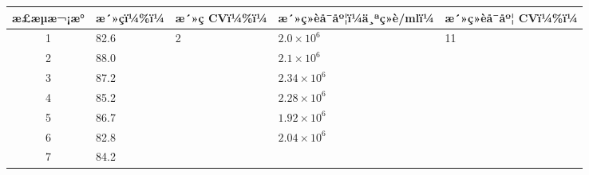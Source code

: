 \documentclass[UTF8,10pt,a4paper,fontset=fandol]{ctexart}
\newcommand{\fieldvalue}[1]{#1}
\newcommand{\handwritten}[1]{#1}
\begin{document}
\begin{center}
\begin{center}
\small
\begin{tabularx}{\textwidth}{|c|X|X|X|X|}
\hline
æ£æµæ¬¡æ° & æ´»çï¼\%ï¼ & æ´»ç CVï¼\%ï¼ & æ´»ç»èå¯åº¦ï¼ä¸ªç»è/mlï¼ & æ´»ç»èå¯åº¦ CVï¼\%ï¼ \\
\hline
1 &
\fieldvalue{\handwritten{82.6}} &
\multirow{9}{*}{
\fieldvalue{\handwritten{2}}} &
\fieldvalue{\handwritten{$2.0\times10^{6}$}} &
\multirow{9}{*}{
\fieldvalue{\handwritten{11}}} \\
\hline
2 &
\fieldvalue{\handwritten{88.0}} &
&
\fieldvalue{\handwritten{$2.1\times10^{6}$}} & \\
\hline
3 &
\fieldvalue{\handwritten{87.2}} &
&
\fieldvalue{\handwritten{$2.34\times10^{6}$}} & \\
\hline
4 &
\fieldvalue{\handwritten{85.2}} &
&
\fieldvalue{\handwritten{$2.28\times10^{6}$}} & \\
\hline
5 &
\fieldvalue{\handwritten{86.7}} &
&
\fieldvalue{\handwritten{$1.92\times10^{6}$}} & \\
\hline
6 &
\fieldvalue{\handwritten{82.8}} &
&
\fieldvalue{\handwritten{$2.04\times10^{6}$}} & \\
\hline
7 &
\fieldvalue{\handwritten{84.2}} &
&

\end{tabularx}
\end{center}
\end{center}
\end{document}
